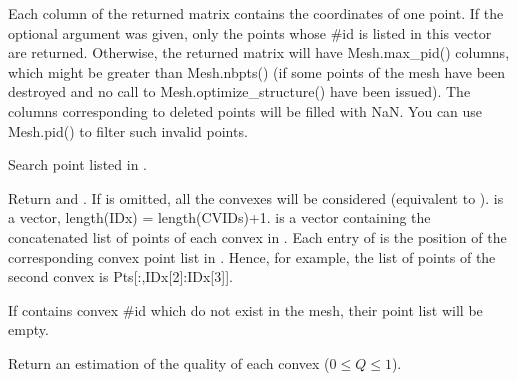 \documentclass[a4paper,11pt,english]{sphinxmanual}
\begin{document}
\begin{fulllineitems}
\begin{fulllineitems}
Each column of the returned matrix contains the coordinates of one
point. If the optional argument  was given, only the points
whose \#id is listed in this vector are returned. Otherwise, the
returned matrix will have Mesh.max\_pid() columns, which might
be greater than Mesh.nbpts() (if some points of the mesh have
been destroyed and no call to Mesh.optimize\_structure() have
been issued). The columns corresponding to deleted points will be
filled with NaN. You can use Mesh.pid() to filter such invalid
points.

\end{fulllineitems}


\begin{fulllineitems}
\label{\detokenize{python/cmdref_Mesh:getfem.Mesh.pts_from_cvid}}
Search point listed in .

Return  and .
If  is omitted, all the convexes will be considered
(equivalent to ).  is a
vector, length(IDx) = length(CVIDs)+1.  is a
vector containing the concatenated list of points
of each convex in . Each entry of  is the position
of the corresponding convex point list in . Hence, for
example, the list of points of the second convex is
Pts{[}:,IDx{[}2{]}:IDx{[}3{]}{]}.

If  contains convex \#id which do not exist in the mesh,
their point list will be empty.

\end{fulllineitems}


\begin{fulllineitems}
\label{\detokenize{python/cmdref_Mesh:getfem.Mesh.quality}}
Return an estimation of the quality of each convex (\(0 \leq Q \leq 1\)).

\end{fulllineitems}


\end{fulllineitems}
\end{document}
